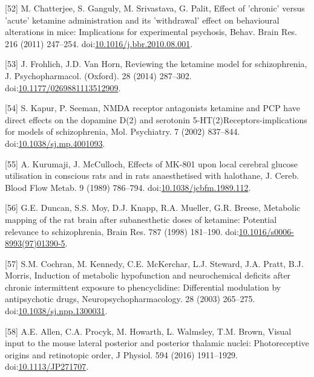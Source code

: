 \documentclass[man]{apa6}
\begin{document}
\leavevmode\hypertarget{ref-chatterjeeEffectChronicAcute2011}{}%
{[}52{]} M. Chatterjee, S. Ganguly, M. Srivastava, G. Palit, Effect of 'chronic' versus 'acute' ketamine administration and its 'withdrawal' effect on behavioural alterations in mice: Implications for experimental psychosis, Behav. Brain Res. 216 (2011) 247--254. doi:\href{https://doi.org/10.1016/j.bbr.2010.08.001}{10.1016/j.bbr.2010.08.001}.

\leavevmode\hypertarget{ref-frohlichReviewingKetamineModel2014}{}%
{[}53{]} J. Frohlich, J.D. Van Horn, Reviewing the ketamine model for schizophrenia, J. Psychopharmacol. (Oxford). 28 (2014) 287--302. doi:\href{https://doi.org/10.1177/0269881113512909}{10.1177/0269881113512909}.

\leavevmode\hypertarget{ref-kapurNMDAReceptorAntagonists2002}{}%
{[}54{]} S. Kapur, P. Seeman, NMDA receptor antagonists ketamine and PCP have direct effects on the dopamine D(2) and serotonin 5-HT(2)Receptors-implications for models of schizophrenia, Mol. Psychiatry. 7 (2002) 837--844. doi:\href{https://doi.org/10.1038/sj.mp.4001093}{10.1038/sj.mp.4001093}.

\leavevmode\hypertarget{ref-kurumajiEffectsMK801Local1989}{}%
{[}55{]} A. Kurumaji, J. McCulloch, Effects of MK-801 upon local cerebral glucose utilisation in conscious rats and in rats anaesthetised with halothane, J. Cereb. Blood Flow Metab. 9 (1989) 786--794. doi:\href{https://doi.org/10.1038/jcbfm.1989.112}{10.1038/jcbfm.1989.112}.

\leavevmode\hypertarget{ref-duncanMetabolicMappingRat1998}{}%
{[}56{]} G.E. Duncan, S.S. Moy, D.J. Knapp, R.A. Mueller, G.R. Breese, Metabolic mapping of the rat brain after subanesthetic doses of ketamine: Potential relevance to schizophrenia, Brain Res. 787 (1998) 181--190. doi:\href{https://doi.org/10.1016/s0006-8993(97)01390-5}{10.1016/s0006-8993(97)01390-5}.

\leavevmode\hypertarget{ref-cochranInductionMetabolicHypofunction2003}{}%
{[}57{]} S.M. Cochran, M. Kennedy, C.E. McKerchar, L.J. Steward, J.A. Pratt, B.J. Morris, Induction of metabolic hypofunction and neurochemical deficits after chronic intermittent exposure to phencyclidine: Differential modulation by antipsychotic drugs, Neuropsychopharmacology. 28 (2003) 265--275. doi:\href{https://doi.org/10.1038/sj.npp.1300031}{10.1038/sj.npp.1300031}.

\leavevmode\hypertarget{ref-allenVisualInputMouse2016}{}%
{[}58{]} A.E. Allen, C.A. Procyk, M. Howarth, L. Walmsley, T.M. Brown, Visual input to the mouse lateral posterior and posterior thalamic nuclei: Photoreceptive origins and retinotopic order, J Physiol. 594 (2016) 1911--1929. doi:\href{https://doi.org/10.1113/JP271707}{10.1113/JP271707}.
\end{document}
